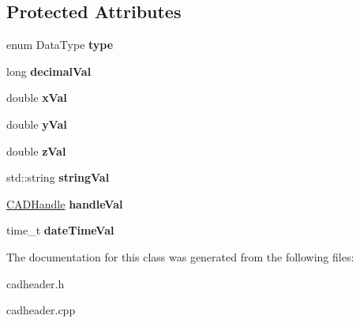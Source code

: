 \subsection*{Protected Attributes}
\begin{DoxyCompactItemize}
\item 
enum Data\+Type {\bfseries type}\hypertarget{class_c_a_d_variant_a7f8b541079fd781dd8b64951518c33ef}{}\label{class_c_a_d_variant_a7f8b541079fd781dd8b64951518c33ef}

\item 
long {\bfseries decimal\+Val}\hypertarget{class_c_a_d_variant_a1add0d317794ac0280075758eee14ddc}{}\label{class_c_a_d_variant_a1add0d317794ac0280075758eee14ddc}

\item 
double {\bfseries x\+Val}\hypertarget{class_c_a_d_variant_a58c570bbd559fb8febaf34dad8e007fb}{}\label{class_c_a_d_variant_a58c570bbd559fb8febaf34dad8e007fb}

\item 
double {\bfseries y\+Val}\hypertarget{class_c_a_d_variant_ad21bffaf6339f26f2275e104e62b7a41}{}\label{class_c_a_d_variant_ad21bffaf6339f26f2275e104e62b7a41}

\item 
double {\bfseries z\+Val}\hypertarget{class_c_a_d_variant_a9b4c220cbac96fe93a0a468dddaf38b8}{}\label{class_c_a_d_variant_a9b4c220cbac96fe93a0a468dddaf38b8}

\item 
std\+::string {\bfseries string\+Val}\hypertarget{class_c_a_d_variant_ac7f329313629f746aaff9fa9b96ce40d}{}\label{class_c_a_d_variant_ac7f329313629f746aaff9fa9b96ce40d}

\item 
\hyperlink{class_c_a_d_handle}{C\+A\+D\+Handle} {\bfseries handle\+Val}\hypertarget{class_c_a_d_variant_aa56db12b2590935af02223110880e0e3}{}\label{class_c_a_d_variant_aa56db12b2590935af02223110880e0e3}

\item 
time\+\_\+t {\bfseries date\+Time\+Val}\hypertarget{class_c_a_d_variant_ad1fe695d98e524bfad16b2d0275b9564}{}\label{class_c_a_d_variant_ad1fe695d98e524bfad16b2d0275b9564}

\end{DoxyCompactItemize}


The documentation for this class was generated from the following files\+:\begin{DoxyCompactItemize}
\item 
cadheader.\+h\item 
cadheader.\+cpp\end{DoxyCompactItemize}
